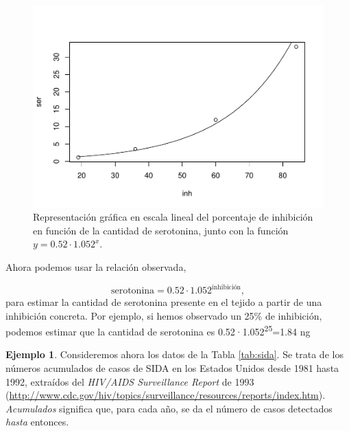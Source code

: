 \documentclass[
]{book}
\theoremstyle{definition}
\theoremstyle{definition}
\newtheorem{example}{Ejemplo}[chapter]
\theoremstyle{definition}
\theoremstyle{remark}
\begin{document}
\begin{figure}

{\centering \includegraphics[width=0.9\linewidth]{03chap02_Un_aperitivo_files/figure-latex/F306bis-1} 

}

\caption{Representación gráfica en escala lineal del porcentaje de inhibición en función de la cantidad de serotonina, junto con la función $y=0.52\cdot 1.052^x$.}\label{fig:F306bis}
\end{figure}

Ahora podemos usar la relación observada,

\[
\textrm{serotonina}= 0.52\cdot 1.052^{\textrm{inhibición}},
\]
para estimar la cantidad de serotonina presente en el tejido a partir de una inhibición concreta. Por ejemplo, si hemos observado un 25\% de inhibición, podemos estimar que la cantidad de serotonina es
0.52·1.052\textsuperscript{25}=1.84 ng

\begin{example}
\protect\hypertarget{exm:reg4}{}{\label{exm:reg4} }Consideremos ahora los datos de la Tabla \ref{tab:sida}. Se trata de los números acumulados de casos de SIDA en los Estados Unidos desde 1981 hasta 1992, extraídos del \emph{HIV/AIDS Surveillance Report} de 1993 (\url{http://www.cdc.gov/hiv/topics/surveillance/resources/reports/index.htm}). \emph{Acumulados} significa que, para cada año, se da el número de casos detectados \emph{hasta} entonces.
\end{example}
\end{document}
